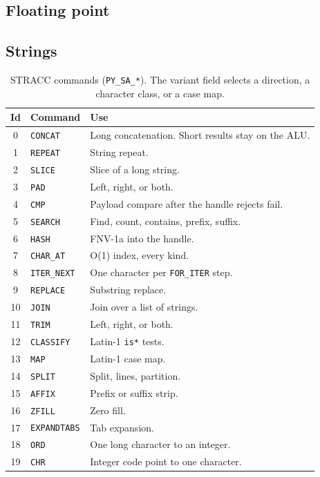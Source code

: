 \documentclass[11pt,a4paper]{article}
\begin{document}
\subsection{Floating point}



\subsection{Strings}



\begin{table}[htbp]
\centering
\caption{STRACC commands (\texttt{PY\_SA\_*}).
The variant field selects a direction, a character class, or a case map.}
\label{tab:sa}
\small
\begin{tabular}{@{}clp{}@{}}
\toprule
Id & Command & Use \\
\midrule
0 & \texttt{CONCAT} & Long concatenation. Short results stay on the ALU. \\
1 & \texttt{REPEAT} & String repeat. \\
2 & \texttt{SLICE} & Slice of a long string. \\
3 & \texttt{PAD} & Left, right, or both. \\
4 & \texttt{CMP} & Payload compare after the handle rejects fail. \\
5 & \texttt{SEARCH} & Find, count, contains, prefix, suffix. \\
6 & \texttt{HASH} & FNV-1a into the handle. \\
7 & \texttt{CHAR\_AT} & O(1) index, every kind. \\
8 & \texttt{ITER\_NEXT} & One character per \texttt{FOR\_ITER} step. \\
9 & \texttt{REPLACE} & Substring replace. \\
10 & \texttt{JOIN} & Join over a list of strings. \\
11 & \texttt{TRIM} & Left, right, or both. \\
12 & \texttt{CLASSIFY} & Latin-1 \texttt{is*} tests. \\
13 & \texttt{MAP} & Latin-1 case map. \\
14 & \texttt{SPLIT} & Split, lines, partition. \\
15 & \texttt{AFFIX} & Prefix or suffix strip. \\
16 & \texttt{ZFILL} & Zero fill. \\
17 & \texttt{EXPANDTABS} & Tab expansion. \\
18 & \texttt{ORD} & One long character to an integer. \\
19 & \texttt{CHR} & Integer code point to one character. \\
\bottomrule
\end{tabular}
\end{table}
\end{document}
